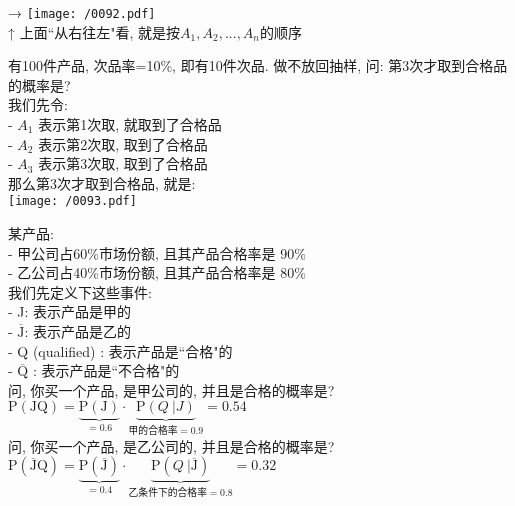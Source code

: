 \documentclass[UTF8]{ctexart}
\begin{document}
	→ \texttt{[image: /0092.pdf]} \\
	↑ 上面``从右往左"看, 就是按$A_1, A_2, ... , A_n$的顺序 \\
	
	
	
	
	\begin{myEnvSample}
		有100件产品, 次品率=10\%, 即有10件次品. 做不放回抽样, 问: 第3次才取到合格品的概率是? \\
		我们先令: \\
		- $A_1$ 表示第1次取, 就取到了合格品 \\
		- $A_2$ 表示第2次取, 取到了合格品 \\
		- $A_3$ 表示第3次取, 取到了合格品 \\
		
		那么第3次才取到合格品, 就是:  \\
		\texttt{[image: /0093.pdf]} 		
	\end{myEnvSample}
	
	


\begin{myEnvSample}
	某产品:  \\
	- 甲公司占60\%市场份额, 且其产品合格率是 90\% \\
	- 乙公司占40\%市场份额, 且其产品合格率是 80\% \\
	
	我们先定义下这些事件: \\
	- J: 表示产品是甲的 \\
	- $\overline{\text{J}}$: 表示产品是乙的 \\
	- Q (qualified) : 表示产品是``合格"的 \\
	- $\overline{\text{Q}}$ : 表示产品是``不合格"的 \\
	
    问, 你买一个产品, 是甲公司的, 并且是合格的概率是? \\
    $
    \text{P}\left( \text{JQ} \right) =\underset{=0.6}{\underbrace{\text{P}\left( \text{J} \right) }}\cdot \underset{\text{甲的合格率}=0.9}{\underbrace{\text{P}\left( Q \ | J \right) }}=0.54
    $ \\
    
    问, 你买一个产品, 是乙公司的, 并且是合格的概率是? \\
    $
    \text{P}\left( \overline{\text{J}}\text{Q} \right) =\underset{=0.4}{\underbrace{\text{P}\left( \overline{\text{J}} \right) }}\cdot \underset{\text{乙条件下的合格率}=0.8}{\underbrace{\text{P}\left(Q \ | \overline{\text{J}} \right) }}=0.32
    $      
\end{myEnvSample}
\end{document}
